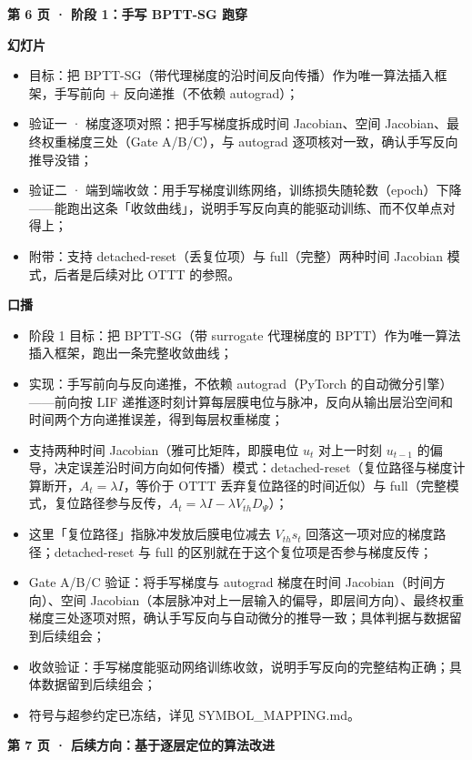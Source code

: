 \documentclass[journal,12pt,onecolumn]{IEEEtran}
\begin{document}
\textbf{第 6 页 · 阶段 1：手写 BPTT-SG 跑穿}

\textbf{幻灯片}
\begin{itemize}[leftmargin=1.5em,itemsep=0pt]
\item 目标：把 BPTT-SG（带代理梯度的沿时间反向传播）作为唯一算法插入框架，手写前向 + 反向递推（不依赖 autograd）；
\item 验证一 · 梯度逐项对照：把手写梯度拆成时间 Jacobian、空间 Jacobian、最终权重梯度三处（Gate A/B/C），与 autograd 逐项核对一致，确认手写反向推导没错；
\item 验证二 · 端到端收敛：用手写梯度训练网络，训练损失随轮数（epoch）下降——能跑出这条「收敛曲线」，说明手写反向真的能驱动训练、而不仅单点对得上；
\item 附带：支持 detached-reset（丢复位项）与 full（完整）两种时间 Jacobian 模式，后者是后续对比 OTTT 的参照。
\end{itemize}

\textbf{口播}
\begin{itemize}[leftmargin=1.5em,itemsep=0pt]
\item 阶段 1 目标：把 BPTT-SG（带 surrogate 代理梯度的 BPTT）作为唯一算法插入框架，跑出一条完整收敛曲线；
\item 实现：手写前向与反向递推，不依赖 autograd（PyTorch 的自动微分引擎）——前向按 LIF 递推逐时刻计算每层膜电位与脉冲，反向从输出层沿空间和时间两个方向递推误差，得到每层权重梯度；
\item 支持两种时间 Jacobian（雅可比矩阵，即膜电位 $u_t$ 对上一时刻 $u_{t-1}$ 的偏导，决定误差沿时间方向如何传播）模式：detached-reset（复位路径与梯度计算断开，$A_t=\lambda I$，等价于 OTTT 丢弃复位路径的时间近似）与 full（完整模式，复位路径参与反传，$A_t=\lambda I-\lambda V_{th}D_\Psi$）；
\item 这里「复位路径」指脉冲发放后膜电位减去 $V_{th}s_t$ 回落这一项对应的梯度路径；detached-reset 与 full 的区别就在于这个复位项是否参与梯度反传；
\item Gate A/B/C 验证：将手写梯度与 autograd 梯度在时间 Jacobian（时间方向）、空间 Jacobian（本层脉冲对上一层输入的偏导，即层间方向）、最终权重梯度三处逐项对照，确认手写反向与自动微分的推导一致；具体判据与数据留到后续组会；
\item 收敛验证：手写梯度能驱动网络训练收敛，说明手写反向的完整结构正确；具体数据留到后续组会；
\item 符号与超参约定已冻结，详见 SYMBOL\_MAPPING.md。
\end{itemize}

\textbf{第 7 页 · 后续方向：基于逐层定位的算法改进}
\end{document}
